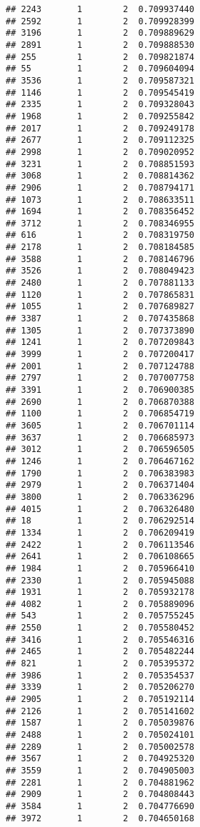\documentclass[
]{article}
\begin{document}
\begin{verbatim}
## 2243       1        2  0.709937440
## 2592       1        2  0.709928399
## 3196       1        2  0.709889629
## 2891       1        2  0.709888530
## 255        1        2  0.709821874
## 55         1        2  0.709604094
## 3536       1        2  0.709587321
## 1146       1        2  0.709545419
## 2335       1        2  0.709328043
## 1968       1        2  0.709255842
## 2017       1        2  0.709249178
## 2677       1        2  0.709112325
## 2998       1        2  0.709020952
## 3231       1        2  0.708851593
## 3068       1        2  0.708814362
## 2906       1        2  0.708794171
## 1073       1        2  0.708633511
## 1694       1        2  0.708356452
## 3712       1        2  0.708346955
## 616        1        2  0.708319750
## 2178       1        2  0.708184585
## 3588       1        2  0.708146796
## 3526       1        2  0.708049423
## 2480       1        2  0.707881133
## 1120       1        2  0.707865831
## 1055       1        2  0.707689827
## 3387       1        2  0.707435868
## 1305       1        2  0.707373890
## 1241       1        2  0.707209843
## 3999       1        2  0.707200417
## 2001       1        2  0.707124788
## 2797       1        2  0.707007758
## 3391       1        2  0.706900385
## 2690       1        2  0.706870388
## 1100       1        2  0.706854719
## 3605       1        2  0.706701114
## 3637       1        2  0.706685973
## 3012       1        2  0.706596505
## 1246       1        2  0.706467162
## 1790       1        2  0.706383983
## 2979       1        2  0.706371404
## 3800       1        2  0.706336296
## 4015       1        2  0.706326480
## 18         1        2  0.706292514
## 1334       1        2  0.706209419
## 2422       1        2  0.706113546
## 2641       1        2  0.706108665
## 1984       1        2  0.705966410
## 2330       1        2  0.705945088
## 1931       1        2  0.705932178
## 4082       1        2  0.705889096
## 543        1        2  0.705755245
## 2550       1        2  0.705580452
## 3416       1        2  0.705546316
## 2465       1        2  0.705482244
## 821        1        2  0.705395372
## 3986       1        2  0.705354537
## 3339       1        2  0.705206270
## 2905       1        2  0.705192114
## 2126       1        2  0.705141602
## 1587       1        2  0.705039876
## 2488       1        2  0.705024101
## 2289       1        2  0.705002578
## 3567       1        2  0.704925320
## 3559       1        2  0.704905003
## 2281       1        2  0.704881962
## 2909       1        2  0.704808443
## 3584       1        2  0.704776690
## 3972       1        2  0.704650168

\end{verbatim}
\end{document}
